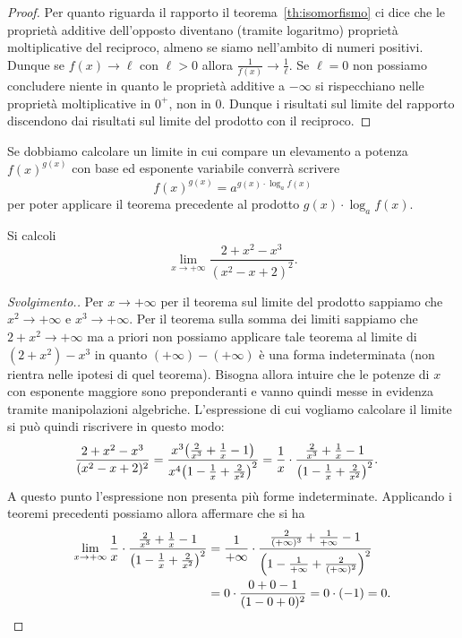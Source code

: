\begin{proof}
Per quanto riguarda il rapporto il teorema~\ref{th:isomorfismo}
ci dice che le proprietà additive dell'opposto diventano (tramite logaritmo)
proprietà moltiplicative del reciproco, almeno se siamo nell'ambito di numeri positivi.
Dunque se $f(x)\to \ell$ con $\ell>0$ 
allora $\frac{1}{f(x)} \to \frac{1}{\ell}$.
Se $\ell=0$ non possiamo concludere niente in quanto le proprietà 
additive a $-\infty$ si rispecchiano nelle proprietà moltiplicative 
in $0^+$, non in $0$. 
Dunque i risultati sul limite del rapporto discendono dai risultati 
sul limite del prodotto con il reciproco.
\end{proof}


Se dobbiamo calcolare un limite in cui compare un elevamento 
a potenza $f(x)^{g(x)}$ con base ed esponente variabile converrà 
scrivere
\[
 f(x)^{g(x)} = a^{g(x)\cdot \log_a f(x)}
\]
per poter applicare il teorema precedente al prodotto $g(x)\cdot \log_a f(x)$.

\begin{example}
  Si calcoli
  \[
  \lim_{x\to +\infty} \frac{2+x^2-x^3}{(x^2-x+2)^2}.
  \]
  \end{example}
  \begin{proof}[Svolgimento.]
  Per $x\to +\infty$ per il teorema sul limite del
  prodotto sappiamo che $x^2\to +\infty$ e
  $x^3\to +\infty$.
  Per il teorema sulla somma dei limiti
  sappiamo che $2+x^2\to +\infty$ ma
  a priori non possiamo applicare tale teorema
  al limite di $(2+x^2)-x^3$ in quanto
  $(+\infty)-(+\infty)$ è una forma indeterminata
  (non rientra nelle ipotesi di quel teorema).
  Bisogna allora intuire che le potenze di $x$
  con esponente maggiore sono preponderanti e vanno
  quindi messe in evidenza tramite
  manipolazioni algebriche. L'espressione
  di cui vogliamo calcolare il limite
  si può quindi riscrivere in questo modo:
  \begin{align*}
  \frac{2+x^2-x^3}{(x^2-x+2)^2}
  &= \frac{x^3 {\left( \frac 2 {x^3}+\frac{1}{x}-1 \right)}}{x^4{\left( 1-\frac 1 x + \frac{2}{x^2} \right)}^2}
  = \frac{1}{x}\cdot \frac{\frac 2 {x^3}+\frac{1}{x}-1}{{\left( 1-\frac 1 x + \frac{2}{x^2} \right)}^2}.
  \end{align*}
  A questo punto l'espressione non presenta più forme indeterminate.
  Applicando i teoremi precedenti possiamo allora affermare che
  si ha
  \begin{align*}
  \lim_{x\to+\infty}\frac{1}{x}\cdot \frac{\frac 2 {x^3}+\frac{1}{x}-1}{{\left( 1-\frac 1 x + \frac{2}{x^2} \right)}^2}
  &= \frac{1}{+\infty} \cdot \frac{\frac 2 {(+\infty)^3}+\frac{1}{+\infty}-1}{{\left( 1-\frac 1 {+\infty} + \frac{2}{(+\infty)^2} \right)}^2}\\
  &= 0 \cdot \frac{0+0-1}{(1-0+0)^2} = 0\cdot (-1) = 0.
  \end{align*}
\end{proof}

